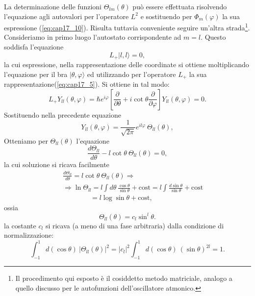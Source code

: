 La determinazione delle funzioni $\Theta _{lm} (\theta)$ può essere effettuata risolvendo l'equazione agli autovalori per l'operatore $L^2$ e sostituendo per $\Phi _m (\varphi)$ la sua espressione (\ref{eq:cap17_10}). Risulta tuttavia conveniente seguire un'altra strada\footnote{Il procedimento qui esposto è il cosiddetto metodo matriciale, analogo a quello discusso per le autofunzioni dell'oscillatore atmonico.}. Consideriamo in primo luogo l'autostato corrispondente ad $m=l$. Questo soddisfa l'equazione
\begin{equation}
L_+ \vert l,l\rangle =0,
\end{equation}
la cui espressione, nella rappresentazione delle coordinate si ottiene moltiplicando l'equazione per il bra $\vert \theta, \varphi \rangle$ ed utilizzando per  l'operatore $L_+$ la sua rappresentazione(\ref{eq:cap17_5}). Si ottiene in tal modo:
\begin{equation}
L_+Y_{ll}(\theta , \varphi ) = \hbar e^{i\varphi}\left[\frac{\partial}{\partial\theta}+i \cot\theta \frac{\partial}{\partial \varphi}\right]Y_{ll}(\theta , \varphi ) =0 .
\end{equation}
Sostituendo nella precedente equazione 
\begin{equation}
Y_{ll}(\theta , \varphi ) = \frac{1}{\sqrt{2\pi}}e^{il\varphi}\ \Theta _{ll} (\theta ) ,
\end{equation}
Otteniamo per $\Theta _{ll} (\theta )$ l'equazione
\begin{equation}
\frac{d\Theta _{ll}}{d \theta}-l\cot\theta \ \Theta _{ll} (\theta )=0 ,
\end{equation}
la cui soluzione si ricava facilmente
\begin{eqnarray}
& &\frac{d\Theta _{ll}}{d \theta}=l\cot\theta \ \Theta _{ll} (\theta ) \Rightarrow \nonumber \\
& &\Rightarrow \ln \Theta _{ll} = l \int d\theta \ \frac{\cos \theta}{\sin \theta}+ \textrm{cost} = l \int  \frac{d\sin \theta}{\sin \theta}+ \textrm{cost} \nonumber \\
& & \qquad \qquad = l \log \sin \theta + \textrm{cost} ,
\end{eqnarray}
ossia
\begin{equation}
\Theta _{ll} (\theta )= c_l \sin ^l \theta .
\end{equation}
la costante $c_l$ si ricava (a meno di una fase arbitraria) dalla condizione di normalizzazione:
\begin{equation}
\int _{-1} ^1 d(\cos \theta )\ \vert \Theta _{ll} (\theta ) \vert ^2 = \vert c_l \vert ^2 \int _{-1} ^1 d(\cos \theta )\ \left( \sin \theta \right) ^{2l} =1.
\end{equation}
